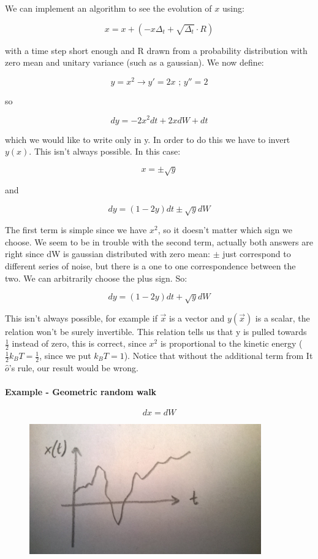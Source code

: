 \documentclass[a4paper, italian, openany]{book}
\begin{document}
We can implement an algorithm to see the evolution of $x$ using:

$$x = x +\left ( -x \Delta_t + \sqrt{\Delta_t} \cdot R \right )$$ 

with a time step short enough and R drawn from a probability distribution with zero mean and unitary variance (such as a gaussian).\newline
We now define:

$$y = x^2 \rightarrow y' = 2x \mbox{ ; } y'' = 2$$

so

$$dy = -2x^2 dt + 2x dW + dt$$

which we would like to write only in y. In order to do this we have to invert $y(x)$. This isn't always possible. In this case:

$$x = \pm \sqrt{y}$$

and

$$dy = (1-2y)dt \pm \sqrt{y} dW$$

The first term is simple since we have $x^2$, so it doesn't matter which sign we choose. We seem to be in trouble with the second term, actually both answers are right since dW is gaussian distributed with zero mean: $\pm$ just correspond to different series of noise, but there is a one to one correspondence between the two. We can arbitrarily choose the plus sign. So:

$$dy = (1-2y)dt + \sqrt{y} dW$$

This isn't always possible, for example if $\overrightarrow{x}$ is a vector and $y(\overrightarrow{x})$ is a scalar, the relation won't be surely invertible.\newline
This relation tells us that y is pulled towards $\frac{1}{2}$ instead of zero, this is correct, since $x^2$ is proportional to the kinetic energy ($\frac{1}{2}k_B T=\frac{1}{2}$, since we put $k_B T = 1$). Notice that without the additional term from It$\hat{o}$'s rule, our result would be wrong. 

\paragraph{Example - Geometric random walk}

$$dx = dW$$

\begin{figure}[H]
\centering
\includegraphics[width=100mm]{img/pic24.jpg}
\end{figure}
\end{document}
